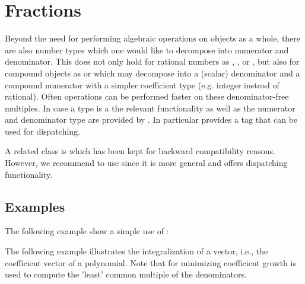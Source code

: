 \section{Fractions}

Beyond the need for performing algebraic operations on objects as a 
whole, there are also number types which one would like to decompose into 
numerator and denominator. This does not only hold for rational numbers 
as , ,  or , but 
also for compound objects as  or  
which may decompose into a (scalar) 
denominator and a compound numerator with a simpler coefficient type 
(e.g. integer instead of rational). Often operations can be performed faster on 
these denominator-free multiples. In case a type is a  
the relevant functionality as well as the numerator and denominator 
type are provided by . In particular  
 provides a tag  that can be
used for dispatching.

A related class is  which has been kept for backward 
compatibility reasons. However, we recommend to use  since
it is more general and offers dispatching functionality. 

\subsection{Examples}

The following example show a simple use of :

The following example illustrates the integralization of a vector, 
i.e., the coefficient vector of a polynomial. Note that for minimizing 
coefficient growth  is used to 
compute the 'least' common multiple of the denominators.


